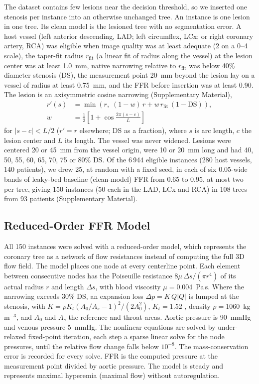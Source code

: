 \documentclass[journal,twoside,web]{ieeecolor}
\begin{document}
The dataset contains few lesions near the decision threshold, so we inserted one stenosis per instance into an
otherwise unchanged tree. An instance is one lesion in one tree. Its clean model is the lesioned tree with no segmentation error. A host vessel (left anterior descending, LAD; left circumflex, LCx; or right coronary artery, RCA) was eligible
when image quality was at least adequate (2 on a 0--4 scale), the taper-fit radius $r_\mathrm{fit}$ (a linear fit of radius along the vessel) at the
lesion center was at least 1.0~mm, native narrowing relative to $r_\mathrm{fit}$ was below 40\% diameter stenosis (DS),
the measurement point 20~mm beyond the lesion lay on a vessel of radius at least 0.75~mm, and the FFR before
insertion was at least 0.90. The lesion is an axisymmetric cosine narrowing (Supplementary Material),
\begin{equation}
\begin{aligned}
r'(s) &= \min\!\left(r,\; (1-w)\,r + w\,r_\mathrm{fit}\,(1-\mathrm{DS})\right),\\
w &= \tfrac{1}{2}\left[1+\cos\tfrac{2\pi (s-c)}{L}\right]
\end{aligned}
\end{equation}
for $|s-c|<L/2$ ($r'=r$ elsewhere; DS as a fraction), where $s$ is arc length, $c$ the lesion center and $L$ its length. The vessel was never widened.
Lesions were centered 20 or 45~mm from the vessel origin, were 10 or 20~mm long and had 40, 50, 55, 60, 65, 70, 75
or 80\% DS. Of the 6\,944 eligible instances (280 host vessels, 140 patients), we drew 25, at random with a fixed seed, in each of six 0.05-wide bands of
leaky-bed baseline (clean-model) FFR from 0.65 to 0.95, at most two per tree, giving 150 instances (50 each in the LAD, LCx and RCA) in 108 trees from 93
patients (Supplementary Material).

\subsection{Reduced-Order FFR Model}
All 150 instances were solved with a reduced-order model, which represents the coronary tree as a network of flow
resistances instead of computing the full 3D flow field. The model places one node at every centerline point. Each element between consecutive nodes has the Poiseuille
resistance $8\mu\,\Delta s/(\pi r^4)$ of its actual radius $r$ and length $\Delta s$, with blood viscosity
$\mu = 0.004$~Pa\,s. Where the narrowing exceeds 30\% DS, an expansion loss $\Delta p = K\,Q|Q|$ is lumped at the
stenosis, with $K = \rho K_t (A_0/A_s - 1)^2 / (2A_0^2)$, $K_t = 1.52$ \cite{young1973}, density
$\rho = 1060$~kg\,m$^{-3}$, and $A_0$ and $A_s$ the reference and throat areas. Aortic pressure is 90~mmHg and
venous pressure 5~mmHg. The nonlinear equations are solved by under-relaxed fixed-point iteration, each step a sparse linear
solve for the node pressures, until the relative flow change falls below $10^{-8}$. The mass-conservation error is recorded for every solve. FFR is the computed
pressure at the measurement point divided by aortic pressure. The model is steady and represents maximal hyperemia
(maximal flow) without autoregulation.
\end{document}
